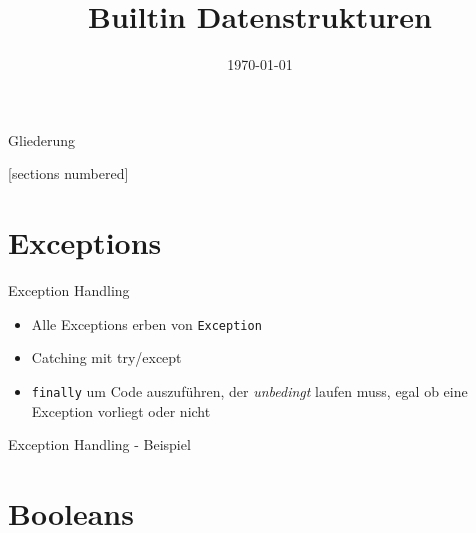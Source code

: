 



\title{Builtin Datenstrukturen}
\date{\today}




\maketitle

\begin{frame}{Gliederung}
	\begin{multicols}{2}
		[sections numbered]
		\tableofcontents
	\end{multicols}
\end{frame}


\section{Exceptions}

\begin{frame}{Exception Handling}
	\begin{itemize}
		\item Alle Exceptions erben von \alert{\texttt{Exception}}
		\item Catching mit try/except
		\item \alert{\texttt{finally}} um Code auszuführen, der \textit{unbedingt} laufen muss, egal ob eine Exception vorliegt oder nicht
	\end{itemize}
\end{frame}

\begin{frame}{Exception Handling - Beispiel}
    
\end{frame}


\section{Booleans}

